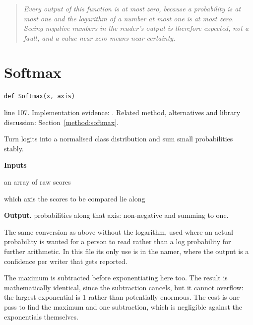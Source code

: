 \begin{quote}\small\itshape Every output of this function is at most zero, because a probability is at most one and the logarithm of a number at most one is at most zero. Seeing negative numbers in the reader's output is therefore expected, not a fault, and a value near zero means near-certainty.\end{quote}


\section{Softmax}\label{fn:recognise:Softmax}
\begin{lstlisting}[style=sig]
def Softmax(x, axis)
\end{lstlisting}
 line 107. Implementation evidence: \cite{code2026}. Related method, alternatives and library discussion: Section~\ref{method:softmax}.


Turn logits into a normalised class distribution and sum small probabilities stably.




\noindent\textbf{Inputs}
\begin{description}[leftmargin=2.2em,style=nextline,font=\normalfont\ttfamily]\setlength\itemsep{1pt}
  \item[{x}] \normalfont an array of raw scores
  \item[{axis}] \normalfont which axis the scores to be compared lie along
\end{description}

\noindent\textbf{Output.} probabilities along that axis: non-negative and summing to one.


The same conversion as above without the logarithm, used where an actual probability is wanted for a person to read rather than a log probability for further arithmetic. In this file its only use is in the namer, where the output is a confidence per writer that gets reported.


The maximum is subtracted before exponentiating here too. The result is mathematically identical, since the subtraction cancels, but it cannot overflow: the largest exponential is 1 rather than potentially enormous. The cost is one pass to find the maximum and one subtraction, which is negligible against the exponentials themselves.


